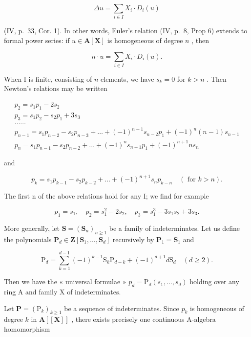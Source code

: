 \[
\Delta u = \sum_ {i \in I} X _ {i} \cdot D _ {i} (u)
\]

(IV, p.~33, Cor. 1). In other words, Euler's relation (IV, p.~8, Prop 6) extends to formal power series: if \(u \in \mathbf{A}[\mathbf{X}]\) is homogeneous of degree \(n\) , then

\[
n \cdot u = \sum_ {i \in I} X _ {i} \cdot D _ {i} (u).\tag{21}
\]

When I is finite, consisting of \(n\) elements, we have \(s_k = 0\) for \(k > n\) . Then Newton's relations may be written

\[
\begin{array}{l} p _ {2} = s _ {1} p _ {1} - 2 s _ {2} \\ p _ {3} = s _ {1} p _ {2} - s _ {2} p _ {1} + 3 s _ {3} \\ \dots \dots \\ p _ {n - 1} = s _ {1} p _ {n - 2} - s _ {2} p _ {n - 3} + \dots + (- 1) ^ {n - 1} s _ {n - 2} p _ {1} + (- 1) ^ {n} (n - 1) s _ {n - 1} \\ p _ {n} = s _ {1} p _ {n - 1} - s _ {2} p _ {n - 2} + \dots + (- 1) ^ {n} s _ {n - 1} p _ {1} + (- 1) ^ {n + 1} n s _ {n} \end{array}
\]

and

\[
p _ {k} = s _ {1} p _ {k - 1} - s _ {2} p _ {k - 2} + \dots + (- 1) ^ {n + 1} s _ {n} p _ {k - n} \quad (\text { for } k > n).\tag{22}
\]

The first n of the above relations hold for any I; we find for example

\[
p _ {1} = s _ {1}, \quad p _ {2} = s _ {1} ^ {2} - 2 s _ {2}, \quad p _ {3} = s _ {1} ^ {3} - 3 s _ {1} s _ {2} + 3 s _ {3}.
\]

More generally, let \(\mathbf{S} = (\mathbf{S}_n)_{n\geqslant 1}\) be a family of indeterminates. Let us define the polynomials \(\mathbf{P}_d\in \mathbf{Z}[\mathbf{S}_1,\dots ,\mathbf{S}_d]\) recursively by \(\mathbf{P}_1 = \mathbf{S}_1\) and

\[
\mathrm{P} _ {d} = \sum_ {k = 1} ^ {d - 1} (- 1) ^ {k - 1} \mathrm{S} _ {k} \mathrm{P} _ {d - k} + (- 1) ^ {d + 1} d \mathrm{S} _ {d} \quad (d \geqslant 2).
\]

Then we have the « universal formulae » \(p_d = \mathrm{P}_d(s_1, \ldots, s_d)\) holding over any ring A and family X of indeterminates.

Let \(\mathbf{P} = (\mathrm{P}_k)_{k\geqslant 1}\) be a sequence of indeterminates. Since \(p_k\) is homogeneous of degree \(k\) in \(\mathbf{A}[[\mathbf{X}]]\) , there exists precisely one continuous A-algebra homomorphism

